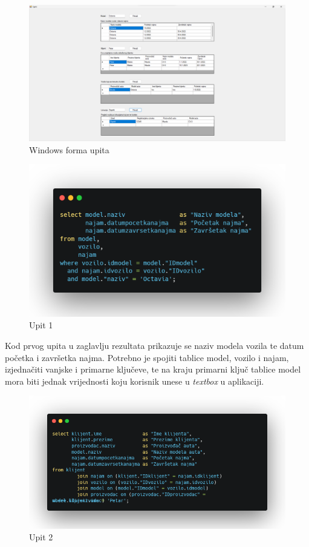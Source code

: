 \documentclass[]{foi} %
\begin{document}
\vspace{20mm}

\begin{figure}[!ht]
    \centering
    \includegraphics[width=1\textwidth]{slike/upit.png}
    \caption{Windows forma upita}
    \label{fig:upit}
\end{figure}
\newpage

\begin{figure}[!ht]
    \centering
    \includegraphics[width=1\textwidth]{slike/u1.png}
    \caption{Upit 1}
    \label{fig:upit1}
\end{figure}

Kod prvog upita u zaglavlju rezultata prikazuje se naziv modela vozila te datum početka i završetka najma. Potrebno je spojiti tablice model, vozilo i najam, izjednačiti vanjske i primarne ključeve, te na kraju primarni ključ tablice model mora biti jednak vrijednosti koju korisnik unese u \textit{textbox} u aplikaciji.

\begin{figure}[!ht]
    \centering
    \includegraphics[width=1\textwidth]{slike/u2.png}
    \caption{Upit 2}
    \label{fig:upit2}
\end{figure}
\end{document}
